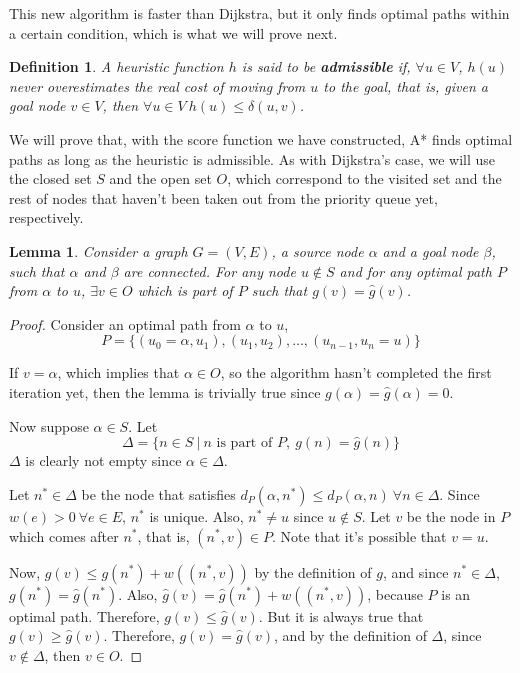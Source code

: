 \documentclass[12pt]{report}
\newtheorem{definition}[theorem]{Definition}
\newtheorem{lemma}[theorem]{Lemma}
\begin{document}
This new algorithm is faster than Dijkstra, but it only finds optimal paths within a certain condition, which is what we will prove next.

\begin{definition}
A heuristic function $h$ is said to be \textbf{admissible} if, $\forall u \in V$, $h(u)$ never overestimates the real cost of moving from $u$ to the goal, that is, given a goal node $v \in V$, then $\forall u \in V \ h(u) \le \delta(u, v)$.
\end{definition}

We will prove that, with the score function we have constructed, A* finds optimal paths as long as the heuristic is admissible. As with Dijkstra's case, we will use the closed set $S$ and the open set $O$, which correspond to the visited set and the rest of nodes that haven't been taken out from the priority queue yet, respectively.

\begin{lemma}
Consider a graph $G = (V, E)$, a source node $\alpha$ and a goal node $\beta$, such that $\alpha$ and $\beta$ are connected. For any node $u \not \in S$ and for any optimal path $P$ from $\alpha$ to $u$, $\exists v \in O$ which is part of $P$ such that $g(v) = \hat{g}(v)$.
\end{lemma}
\begin{proof}
Consider an optimal path from $\alpha$ to $u$,
\[P = \{ (u_0 = \alpha, u_1), (u_1, u_2), \dots, (u_{n-1}, u_n = u) \}\]

If $v = \alpha$, which implies that $\alpha \in O$, so the algorithm hasn't completed the first iteration yet, then the lemma is trivially true since $g(\alpha) = \hat{g}(\alpha) = 0$.

Now suppose $\alpha \in S$. Let
\[ \Delta = \{ n \in S \  | \  n \text{ is part of } P,\  g(n) = \hat{g}(n) \} \]
$\Delta$ is clearly not empty since $\alpha \in \Delta$.

Let $n^* \in \Delta$ be the node that satisfies $d_P(\alpha, n^*) \leq d_P(\alpha, n) \  \forall n \in \Delta$. Since $w(e) > 0\  \forall e \in E$, $n^*$ is unique. Also, $n^* \neq u$ since $u \not \in S$. Let $v$ be the node in $P$ which comes after $n^*$, that is, $(n^*, v) \in P$. Note that it's possible that $v = u$.

Now, $g(v) \leq g(n^*) + w((n^*, v))$ by the definition of $g$, and since $n^* \in \Delta$, $g(n^*) = \hat{g}(n^*)$. Also, $\hat{g}(v) = \hat{g}(n^*) + w((n^*, v))$, because $P$ is an optimal path. Therefore, $g(v) \leq \hat{g}(v)$. But it is always true that $g(v) \geq \hat{g}(v)$. Therefore, $g(v) = \hat{g}(v)$, and by the definition of $\Delta$, since $v \not \in \Delta$, then $v \in O$. 
\end{proof}
\end{document}
